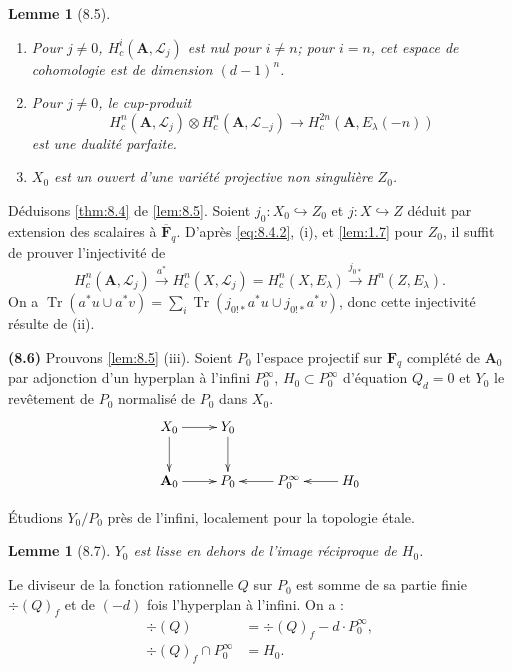 \documentclass[12pt,a4paper]{amsart}
\theoremstyle{plain}
\newtheorem{lemme}[theoreme]{Lemme}
\theoremstyle{definition}
\theoremstyle{remark}
\DeclareMathOperator{\Tr}{Tr}
\newcommand{\F}{\mathbf{F}}
\numberwithin{equation}{section}
\begin{document}
\begin{lemme}[8.5]\label{lem:8.5}
\begin{enumerate}
\item[(i)] Pour $j\not=0$, $H^i_c(\mathbf{A},\mathscr{L}_j)$ est nul pour $i\not=n$; pour $i=n$, cet espace de cohomologie est de dimension $(d-1)^n$.
\item[(ii)] Pour $j\not=0$, le cup-produit
\[
H^n_c(\mathbf{A},\mathscr{L}_j) \otimes H^n_c(\mathbf{A},\mathscr{L}_{-j}) \longrightarrow H^{2n}_c(\mathbf{A},E_\lambda(-n))
\]
est une dualit\'e parfaite.
\item[(iii)] $X_0$ est un ouvert d'une vari\'et\'e projective non singuli\`ere $Z_0$.
\end{enumerate}
\end{lemme}

D\'eduisons \eqref{thm:8.4} de \eqref{lem:8.5}. Soient $j_0:X_0\hookrightarrow Z_0$ et $j:X\hookrightarrow Z$ d\'eduit par extension des scalaires \`a $\overline{\F}_q$. D'apr\`es \eqref{eq:8.4.2}, (i), et \eqref{lem:1.7} pour $Z_0$, il suffit de prouver l'injectivit\'e de
\[
H^n_c(\mathbf{A},\mathscr{L}_j) \xrightarrow{a^\ast} H^n_c(X,\mathscr{L}_j) = H^n_c(X,E_\lambda) \xrightarrow{j_{0\ast}} H^n(Z,E_\lambda).
\]
On a $\Tr(a^\ast u \cup a^\ast v) = \sum_i \Tr(j_{0!\ast}a^\ast u \cup j_{0!\ast}a^\ast v)$, donc cette injectivit\'e r\'esulte de (ii).

\noindent \textbf{(8.6)} Prouvons \eqref{lem:8.5} (iii). Soient $P_0$ l'espace projectif sur $\F_q$ compl\'et\'e de $\mathbf{A}_0$ par adjonction d'un hyperplan \`a l'infini $P_0^\infty$, $H_0\subset P_0^\infty$ d'\'equation $Q_d=0$ et $Y_0$ le rev\^etement de $P_0$ normalis\'e de $P_0$ dans $X_0$.
\begin{equation}\label{eq:8.6.1}
\xymatrix{
X_0 \ar[r] \ar[d] & Y_0 \ar[d] \\
\mathbf{A}_0 \ar[r] & P_0 & P_0^\infty \ar[l] & H_0 \ar[l]
}
\end{equation}

\'Etudions $Y_0/P_0$ pr\`es de l'infini, localement pour la topologie \'etale.

\begin{lemme}[8.7]\label{lem:8.7}
$Y_0$ est lisse en dehors de l'image r\'eciproque de $H_0$.
\end{lemme}

Le diviseur de la fonction rationnelle $Q$ sur $P_0$ est somme de sa partie finie $\div(Q)_f$ et de $(-d)$ fois l'hyperplan \`a l'infini. On a :
\begin{align*}
\div(Q) &= \div(Q)_f - d \cdot P_0^\infty, \\
\div(Q)_f \cap P_0^\infty &= H_0.
\end{align*}
\end{document}
